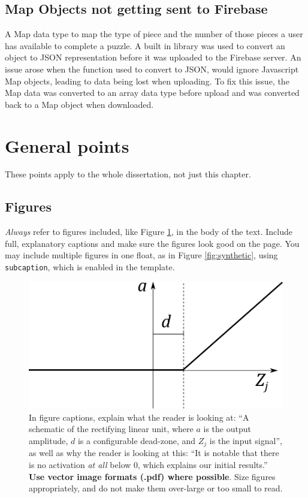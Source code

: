 \documentclass{l4proj}
\begin{document}
\subsection{Map Objects not getting sent to Firebase}
A Map data type to map the type of piece and the number of those pieces a user has available to complete a puzzle. A built in library was used to convert an object to JSON representation before it was uploaded to the Firebase server. An issue arose when the function used to convert to JSON, would ignore Javascript Map objects, leading to data being lost when uploading. To fix this issue, the Map data was converted to an array data type before upload and was converted back to a Map object when downloaded.


\section{General points}

These points apply to the whole dissertation, not just this chapter.



\subsection{Figures}
\emph{Always} refer to figures included, like Figure \ref{fig:relu}, in the body of the text. Include full, explanatory captions and make sure the figures look good on the page.
You may include multiple figures in one float, as in Figure \ref{fig:synthetic}, using \texttt{subcaption}, which is enabled in the template.



\begin{figure}
    \centering
    \includegraphics[width=0.5\linewidth]{images/relu.pdf}    

    \caption{In figure captions, explain what the reader is looking at: ``A schematic of the rectifying linear unit, where $a$ is the output amplitude,
    $d$ is a configurable dead-zone, and $Z_j$ is the input signal'', as well as why the reader is looking at this: 
    ``It is notable that there is no activation \emph{at all} below 0, which explains our initial results.'' 
    \textbf{Use vector image formats (.pdf) where possible}. Size figures appropriately, and do not make them over-large or too small to read.
    }

    \label{fig:relu} 
\end{figure}
\end{document}
